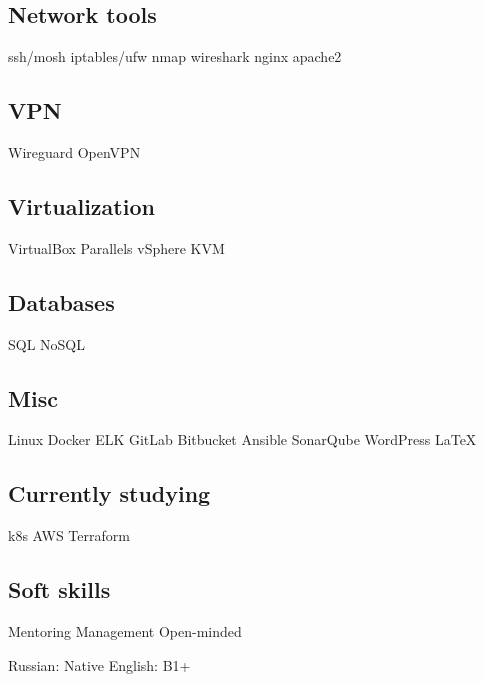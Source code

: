 \documentclass[a4paper]{MagicalCV}
\begin{document}
\begin{minipage}[t]{0.33\textwidth}
\subsection{Network tools}
ssh/mosh \textbullet{} iptables/ufw \textbullet{} nmap \textbullet{}
wireshark \textbullet{} nginx \textbullet{} apache2
\subsection{VPN}
Wireguard \textbullet{} OpenVPN
\subsection{Virtualization}
VirtualBox \textbullet{} Parallels \textbullet{} vSphere \textbullet{} KVM
\subsection{Databases}
SQL \textbullet{} NoSQL
\subsection{Misc}
Linux \textbullet{} Docker \textbullet{} ELK \textbullet{} GitLab \textbullet{}
Bitbucket \textbullet{} Ansible \textbullet{} SonarQube \textbullet {}
WordPress \textbullet{} \LaTeX
\subsection{Currently studying}
k8s \textbullet{} AWS \textbullet{} Terraform
\subsection{Soft skills}
Mentoring \textbullet{} Management \textbullet{} Open-minded
\sectionsep


Russian: Native \textbullet{} English: B1+
\sectionsep

\end{minipage} 
\hfill
\end{document}
